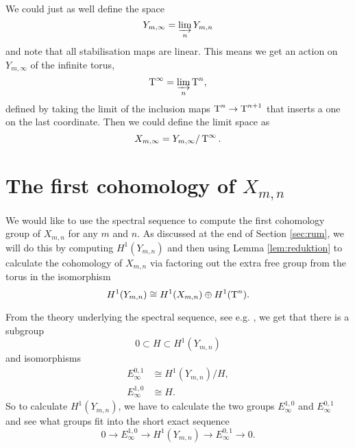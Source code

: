 We could just as well define the space 
\[ Y_{m,\infty} = \varinjlim_n Y_{m,n} \]
and note that all stabilisation maps are linear. This means we get an
action on $Y_{m,\infty}$ of the infinite torus,
\[ \operatorname{T}^\infty = \varinjlim_n \operatorname{T}^n, \]
defined by taking the
limit of the
inclusion maps $\operatorname{T}^n \to \operatorname{T}^{n+1}$ that inserts a one on the last
coordinate.
Then we could define the limit space as
\[ X_{m,\infty} = Y_{m,\infty}/\operatorname{T}^\infty. \]





\section{The first cohomology of $X_{m,n}$}
\label{sec:firstcohom}

We would like to use the spectral sequence to compute the first
cohomology group of $X_{m,n}$ for any $m$ and $n$. As discussed at the
end of Section \ref{sec:rum}, we will do this by computing
$H^1(Y_{m,n})$ and
then using Lemma \ref{lem:reduktion} to calculate the cohomology of
$X_{m,n}$ via factoring out the extra free group from the torus
in the isomorphism
\[ H^1(Y_{m,n}) \cong H^1(X_{m,n}) \oplus H^1(\operatorname{T}^n). \]

From the theory
underlying the spectral sequence, see e.g. \cite[Chapter
1]{hatcherss}, we get that there is a subgroup
\[ 0 \subset H \subset H^1(Y_{m,n}) \]
and isomorphisms
\begin{align*}
  E_\infty^{0,1} &\cong H^1(Y_{m,n})/H, \\
  E_\infty^{1,0} &\cong H.
\end{align*}
So to calculate $H^1(Y_{m,n})$, we have to calculate the two groups
$E_\infty^{1,0}$ and $E_\infty^{0,1}$ and see what groups fit
into the short exact sequence
\[ 0 \to E^{1,0}_\infty \to H^1(Y_{m,n}) \to E^{0,1}_\infty \to 0. \]

